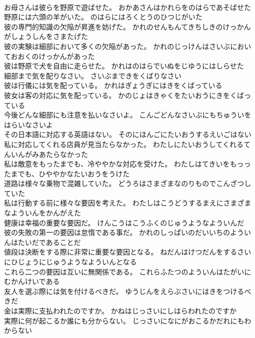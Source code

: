 \documentclass[8pt]{extreport}
\begin{document}
\begin{CJK}{UTF8}{min}
\\	お母さんは彼らを野原で遊ばせた。	おかあさんはかれらをのはらであそばせた 
\\	野原には六頭の羊がいた。	のはらにはろくとうのひつじがいた 
\\	彼の専門的知識の欠陥が昇進を妨げた。	かれのせんもんてきちしきのけっかんがしょうしんをさまたげた 
\\	彼の実験は細部において多くの欠陥があった。	かれのじっけんはさいぶにおいておおくのけっかんがあった 
\\	彼は野原で犬を自由に走らせた。	かれはのはらでいぬをじゆうにはしらせた 
\\	細部まで気を配りなさい。	さいぶまできをくばりなさい 
\\	彼は行儀には気を配っている。	かれはぎょうぎにはきをくばっている 
\\	彼女は客の対応に気を配っている。	かのじょはきゃくをたいおうにきをくばっている 
\\	今後どんな細部にも注意を払いなさいよ。	こんごどんなさいぶにもちゅういをはらいなさいよ 
\\	その日本語に対応する英語はない。	そのにほんごにたいおうするえいごはない 
\\	私に対応してくれる店員が見当たらなかった。	わたしにたいおうしてくれるてんいんがみあたらなかった 
\\	私は敵意をもったまでも、冷ややかな対応を受けた。	わたしはてきいをもっったまでも、ひややかなたいおうをうけた 
\\	道路は様々な乗物で混雑していた。	どうろはさまざまなのりものでこんざつしていた 
\\	私は行動する前に様々な要因を考えた。	わたしはこうどうするまえにさまざまなよういんをかんがえた 
\\	健康は幸福の重要な要因だ。	けんこうはこうふくのじゅうようなよういんだ 
\\	彼の失敗の第一の要因は怠惰である事だ。	かれのしっぱいのだいいちのよういんはたいだであることだ 
\\	値段は決断をする際に非常に重要な要因となる。	ねだんはけつだんをするさいにひじょうにじゅうようなよういんとなる 
\\	これら二つの要因は互いに無関係である。	これらふたつのよういんはたがいにむかんけいである 
\\	友人を選ぶ際には気を付けるべきだ。	ゆうじんをえらぶさいにはきをつけるべきだ 
\\	金は実際に支払われたのですか。	かねはじっさいにしはらわれたのですか 
\\	実際に何が起こるか誰にも分からない。	じっさいになにがおこるかだれにもわからない 

\end{CJK}
\end{document}
